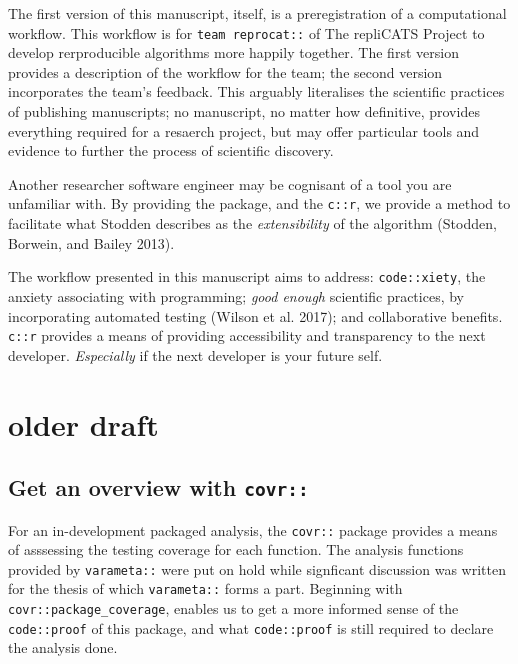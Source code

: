 \documentclass[
]{article}
\begin{document}
The first version of this manuscript, itself, is a preregistration of a
computational workflow. This workflow is for \texttt{team\ reprocat::}
of The repliCATS Project to develop rerproducible algorithms more
happily together. The first version provides a description of the
workflow for the team; the second version incorporates the team's
feedback. This arguably literalises the scientific practices of
publishing manuscripts; no manuscript, no matter how definitive,
provides everything required for a resaerch project, but may offer
particular tools and evidence to further the process of scientific
discovery.

Another researcher software engineer may be cognisant of a tool you are
unfamiliar with. By providing the package, and the \texttt{c::r}, we
provide a method to facilitate what Stodden describes as the
\emph{extensibility} of the algorithm (Stodden, Borwein, and Bailey
2013).

The workflow presented in this manuscript aims to address:
\texttt{code::xiety}, the anxiety associating with programming;
\emph{good enough} scientific practices, by incorporating automated
testing (Wilson et al. 2017); and collaborative benefits. \texttt{c::r}
provides a means of providing accessibility and transparency to the next
developer. \emph{Especially} if the next developer is your future self.

\hypertarget{older-draft}{%
\section{older draft}\label{older-draft}}

\hypertarget{get-an-overview-with-covr}{%
\subsection{\texorpdfstring{Get an overview with
\texttt{covr::}\label{sec: covr}}{Get an overview with covr::}}\label{get-an-overview-with-covr}}

For an in-development packaged analysis, the \texttt{covr::} package
provides a means of asssessing the testing coverage for each function.
The analysis functions provided by \texttt{varameta::} were put on hold
while signficant discussion was written for the thesis of which
\texttt{varameta::} forms a part. Beginning with
\texttt{covr::package\_coverage}, enables us to get a more informed
sense of the \texttt{code::proof} of this package, and what
\texttt{code::proof} is still required to declare the analysis done.
\end{document}
